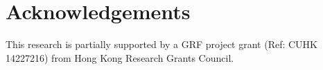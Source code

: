 \documentclass[a4paper]{article}
\begin{document}


\section{Acknowledgements}
This research is partially supported by a GRF project grant (Ref: CUHK 14227216) from Hong Kong Research Grants Council.





\end{document}
